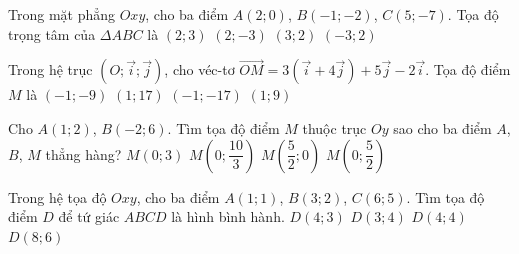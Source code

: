 \begin{ex}%
	Trong mặt phẳng $Oxy$, cho ba điểm $A(2;0)$, $B(-1;-2)$, $C(5;-7)$. Tọa độ trọng tâm của $\Delta ABC$ là
	\choice
	{$(2;3)$}
	{\True $(2;-3)$}
	{$(3;2)$}
	{$(-3;2)$}
\end{ex}

\begin{ex}%
	Trong hệ trục $\left(O;\overrightarrow{i};\overrightarrow{j}\right)$, cho véc-tơ $\overrightarrow{OM}=3\left(\overrightarrow{i}+4\overrightarrow{j}\right)+5\overrightarrow{j}-2\overrightarrow{i}$. Tọa độ điểm $M$ là
	\choice
	{$(-1;-9)$}
	{\True $(1;17)$}
	{$(-1;-17)$}
	{$(1;9)$}
\end{ex}

\begin{ex}%
	Cho $A(1;2)$, $B(-2;6)$. Tìm tọa độ điểm $M$ thuộc trục $Oy$ sao cho ba điểm $A$, $B$, $M$ thẳng hàng?
	\choice
	{$M(0;3)$}
	{\True $M\left(0;\dfrac{10}{3}\right)$}
	{$M\left(\dfrac{5}{2};0\right)$}
	{$M\left(0;\dfrac{5}{2}\right)$}
\end{ex}

\begin{ex}%
	Trong hệ tọa độ $Oxy$, cho ba điểm $A(1;1)$, $B(3;2)$, $C(6;5)$. Tìm tọa độ điểm $D$ để tứ giác $ABCD$ là hình bình hành.
	\choice
	{$D(4;3)$}
	{$D(3;4)$}
	{\True $D(4;4)$}
	{$D(8;6)$}
\end{ex}

